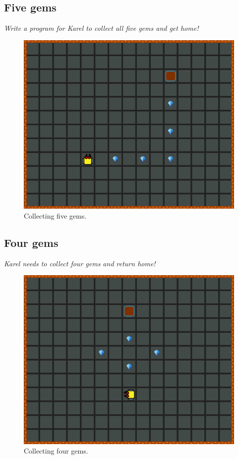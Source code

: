 {{\subsection{Five gems}

{\em Write a program for Karel to collect all five gems and get home!}
\begin{figure}[!ht]
\begin{center}
\includegraphics[height=0.4\textwidth]{img/a18.png}
\end{center}
\vspace{-4mm}
\caption{Collecting five gems.}
\label{fig:a18}
\vspace{-4mm}
\end{figure}



\subsection{Four gems}
{\em Karel needs to collect four gems and return home!}

\begin{figure}[!ht]
\begin{center}
\includegraphics[height=0.4\textwidth]{img/a19.png}
\end{center}
\vspace{-4mm}
\caption{Collecting four gems.}
\label{fig:b06}
\vspace{-10mm}
\end{figure}



}}
